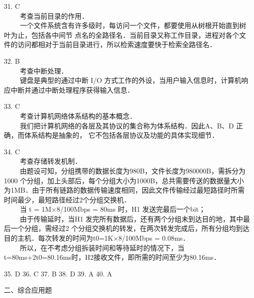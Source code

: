 31. C \\
$\qquad$ 考查当前目录的作用．\\
$\qquad$ 一个文件系统含有许多级时，每访问一个文件，都要使用从树根开始直到树叶为止，包括各中间节
点名的全路径名．当前目录又称工作目录，进程对各个文件的访问都相对于当前目录进行，所以检索速度要快于检索全路径名．

32. B \\
$\qquad$ 考查中断处理．\\
$\qquad$ 键盘是典型的通过中断 I/O 方式工作的外设，当用户输入信息时，计算机响应中断并通过中断处理程序获得输入信息．

33. C \\
$\qquad$ 考查计算机网络体系结构的基本概念．\\
$\qquad$ 我们把计算机网络的各层及其协议的集合称为体系结构．因此A、B、D 正确，而体系结构是抽象的，
它不包括各层协议及功能的具体实现细节．

34. C \\
$\qquad$ 考查存储转发机制．\\
$\qquad$ 由题设可知，分组携带的数据长度为980B，文件长度为980000B，需拆分为1000 个分组，加上头部后，每个分组大小为1000B，总共需要传送的数据量大小为1MB．由于所有链路的数据传输速度相同，因此文件传输经过最短路径时所需时间最少，最短路径经过2个分组交换机．\\
$\qquad$ 当 t = 1M×8/100Mbps = 80ms 时，H1 发送完最后一个bit；\\
$\qquad$ 由于传输延时，当H1 发完所有数据后，还有两个分组未到达目的地，其中最后一个分组，需经过2
个分组交换机的转发，在两次转发完成后，所有分组均到达目的主机．每次转发的时间为t0=1K×8/100Mbps = 0.08ms．\\
$\qquad$ 所以，在不考虑分组拆装时间和等待延时的情况下，当 t=80ms+2t0=80.16ms时，H2接收文件，即所需的时间至少为80.16ms．

35. D 36. C 37. B 38. D 39. A 40. A

二、综合应用题

